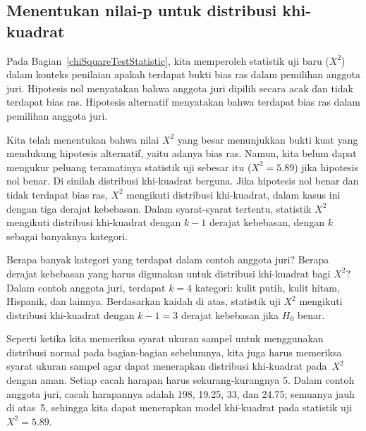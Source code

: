 
\subsection{Menentukan nilai-p untuk distribusi khi-kuadrat}
\label{pValueForAChiSquareTest}

Pada Bagian~\ref{chiSquareTestStatistic}, kita memperoleh statistik uji baru ($X^2$) dalam konteks penilaian apakah terdapat bukti bias ras dalam pemilihan anggota juri. Hipotesis nol menyatakan bahwa anggota juri dipilih secara acak dan tidak terdapat bias ras. Hipotesis alternatif menyatakan bahwa terdapat bias ras dalam pemilihan anggota juri.

Kita telah menentukan bahwa nilai $X^2$ yang besar menunjukkan bukti kuat yang mendukung hipotesis alternatif, yaitu adanya bias ras. Namun, kita belum dapat mengukur peluang teramatinya statistik uji sebesar itu ($X^2=5.89$) jika hipotesis nol benar. Di sinilah distribusi khi-kuadrat berguna. Jika hipotesis nol benar dan tidak terdapat bias ras, $X^2$ mengikuti distribusi khi-kuadrat, dalam kasus ini dengan tiga derajat kebebasan. Dalam syarat-syarat tertentu, statistik $X^2$ mengikuti distribusi khi-kuadrat dengan $k - 1$ derajat kebebasan, dengan $k$ sebagai banyaknya kategori.

\begin{examplewrap}
\begin{nexample}{Berapa banyak kategori yang terdapat dalam contoh anggota juri? Berapa derajat kebebasan yang harus digunakan untuk distribusi khi-kuadrat bagi $X^2$?}
Dalam contoh anggota juri, terdapat $k=4$ kategori: kulit putih, kulit hitam, Hispanik, dan lainnya. Berdasarkan kaidah di atas, statistik uji $X^2$ mengikuti distribusi khi-kuadrat dengan $k-1 = 3$ derajat kebebasan jika $H_0$ benar.
\end{nexample}
\end{examplewrap}

Seperti ketika kita memeriksa syarat ukuran sampel untuk menggunakan distribusi
normal pada bagian-bagian sebelumnya, kita juga harus memeriksa syarat
ukuran sampel agar dapat menerapkan distribusi khi-kuadrat
pada~$X^2$ dengan aman.
Setiap cacah harapan harus sekurang-kurangnya 5. Dalam contoh anggota juri,
cacah harapannya adalah 198, 19.25, 33, dan 24.75; semuanya jauh
di atas~5, sehingga kita dapat menerapkan model khi-kuadrat pada
statistik uji $X^2=5.89$.

